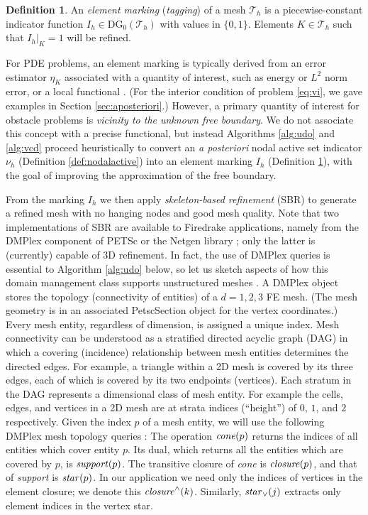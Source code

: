 \documentclass[]{interact}
\theoremstyle{plain}%
\theoremstyle{definition}
\newtheorem{definition}[theorem]{Definition}
\theoremstyle{remark}
\newcommand{\cT}{\mathcal{T}}
\newcommand{\DG}{\text{DG}}
\begin{document}
\begin{definition} \label{def:marking}
An \emph{element marking} (\emph{tagging}) of a mesh $\cT_h$ is a piecewise-constant indicator function $I_h \in \DG_0(\cT_h)$ with values in $\{0,1\}$.  Elements $K \in \cT_h$ such that $I_h|_K=1$ will be refined.
\end{definition}

For PDE problems, an element marking is typically derived from an error estimator $\eta_K$ associated with a quantity of interest, such as energy or $L^2$ norm error, or a local functional \cite{BangerthRannacher2003}.  (For the interior condition of problem \eqref{eq:vi}, we gave examples in Section \ref{sec:aposteriori}.)  However, a primary quantity of interest for obstacle problems is \emph{vicinity to the unknown free boundary}.  We do not associate this concept with a precise functional, but instead Algorithms \ref{alg:udo} and \ref{alg:vcd} proceed heuristically to convert an \emph{a posteriori} nodal active set indicator $\nu_h$ (Definition \ref{def:nodalactive}) into an element marking $I_h$ (Definition \ref{def:marking}), with the goal of improving the approximation of the free boundary.

From the marking $I_h$ we then apply \emph{skeleton-based refinement} (SBR) \cite{PlazaCarey2000} to generate a refined mesh with no hanging nodes and good mesh quality.  Note that two implementations of SBR are available to Firedrake applications, namely from the DMPlex component of PETSc \cite{petsc-user-ref} or the Netgen library \cite{Betteridgeetal2024}; only the latter is (currently) capable of 3D refinement.  In fact, the use of DMPlex queries is essential to Algorithm \ref{alg:udo} below, so let us sketch aspects of how this domain management class supports unstructured meshes \cite{Langeetal2016}.  A DMPlex object stores the topology (connectivity of entities) of a $d=1,2,3$ FE mesh.  (The mesh geometry is in an associated PetscSection object for the vertex coordinates.)  Every mesh entity, regardless of dimension, is assigned a unique index.  Mesh connectivity can be understood as a stratified directed acyclic graph (DAG) in which a covering (incidence) relationship between mesh entities determines the directed edges.  For example, a triangle within a 2D mesh is covered by its three edges, each of which is covered by its two endpoints (vertices).  Each stratum in the DAG represents a dimensional class of mesh entity.  For example the cells, edges, and vertices in a 2D mesh are at strata indices (``height'') of $0$, $1$, and $2$ respectively.  Given the index $p$ of a mesh entity, we will use the following DMPlex mesh topology queries \cite{petsc-user-ref}:  The operation $\text{\emph{cone}}(p)$ returns the indices of all entities which cover entity $p$.  Its dual, which returns all the entities which are covered by $p$, is $\text{\emph{support}}(p)$.  The transitive closure of \emph{cone} is $\text{\emph{closure}}(p)$, and that of \emph{support} is $\text{\emph{star}}(p)$.  In our application we need only the indices of vertices in the element closure; we denote this $\text{\emph{closure}}^\wedge(k)$.  Similarly, $\text{\emph{star}}_\vee(j)$ extracts only element indices in the vertex star.
\end{document}
